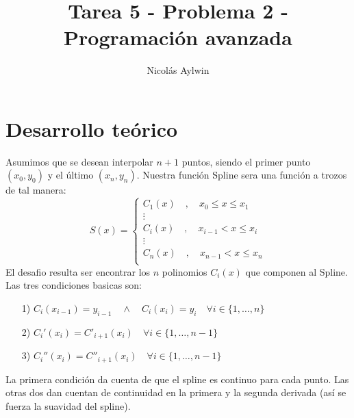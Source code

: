 \documentclass[12pt]{article}
\title{Tarea 5 - Problema 2 - Programación avanzada}
\author{Nicolás Aylwin}
\date{}
\begin{document}
\maketitle
\section{Desarrollo teórico}
Asumimos que se desean interpolar $n+1$ puntos, siendo el primer punto $(x_0,y_0)$ y el último $(x_n,y_n)$. Nuestra función Spline sera una función a trozos de tal manera:
$$
S(x) =
\left\{ \begin{array}{lcc}
C_1(x) \quad ,  \quad x_0 \leq x \leq x_1\\
\vdots \\
C_i(x) \quad , \quad x_{i-1} < x \leq x_i\\
\vdots\\
C_n(x) \quad , \quad x_{n-1} < x \leq x_n \\
             \end{array}
   \right.
   $$
El desafio resulta ser encontrar los $n$ polinomios $C_i(x)$ que componen al Spline. Las tres condiciones basicas son:
\begin{itemize}
\item[1)] $C_i(x_{i-1})=y_{i-1} \quad \wedge \quad C_i(x_{i})=y_{i} \quad \forall i\in\{1,\dots,n\}$
\item[2)] $C_i'(x_i)=C'_{i+1}(x_i) \quad \forall i\in\{1,\dots,n-1\}$
\item[3)] $C_i''(x_i)=C''_{i+1}(x_i) \quad \forall i\in\{1,\dots,n-1\}$
\end{itemize}
La primera condición da cuenta de que el spline es continuo para cada punto. Las otras dos dan cuentan de continuidad en la primera y la segunda derivada (así se fuerza la suavidad del spline).
\end{document}
